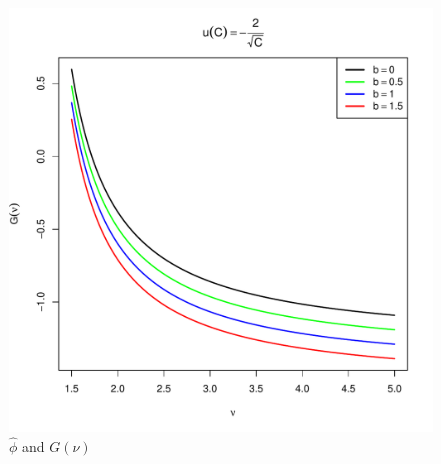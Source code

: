 \documentclass[11pt,a4]{amsart}
\newcommand{\wt}{\widetilde}
\newcommand{\1}{{\mathbf 1}}
\begin{document}
\begin{figure}[htb!]
\begin{minipage}{0.5\linewidth}
  \end{minipage}\hfill
  \begin{minipage}{0.5\linewidth}
    \includegraphics[width=\textwidth]{U_b_t_power.pdf}
  \end{minipage}
  \caption{$\hat\phi$ and $G(\nu)$
    \label{fig:phi_hat_U}
  }
\end{figure}

\end{document}
